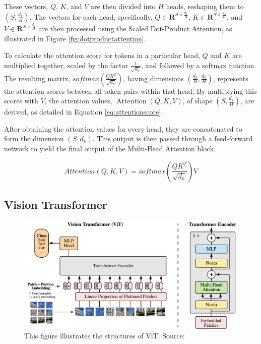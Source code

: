 These vectors, $Q$, $K$, and $V$ are then divided into $H$ heads, reshaping them to $(S, \frac{d_k}{H})$. The vectors for each head, specifically, $Q \in \mathbf{R}^{S \times \frac{d_k}{H}}$, $K \in \mathbf{R}^{S \times \frac{d_k}{H}}$, and $V \in \mathbf{R}^{S \times \frac{d_k}{H}}$ are then processed using the Scaled Dot-Product Attention, as illustrated in Figure \ref{fig:dotproductattention}. 

To calculate the attention score for tokens in a particular head, $Q$ and $K$ are multiplied together, scaled by the factor $\frac{1}{\sqrt{d_k}}$, and followed by a softmax function. The resulting matrix, $softmax\left(\frac{Q K^T}{\sqrt{d_k}}\right)$, having dimensions $(\frac{d_k}{H}, \frac{d_k}{H})$, represents the attention scores between all token pairs within that head. By multiplying this scores with $V$, the attention values, $\operatorname{Attention}(Q, K, V)$, of shape $(S, \frac{d_k}{H})$, are derived, as detailed in Equation \ref{eq:attentionscore}.
 
After obtaining the attention values for every head, they are concatenated to form the dimension $(S, d_k)$. This output is then passed through a feed-forward network to yield the final output of the Multi-Head Attention block.

\begin{equation}
    Attention(Q, K, V)=softmax\left(\frac{Q K^T}{\sqrt{d_k}}\right) V
    \label{eq:attentionscore}
\end{equation}

\subsection{Vision Transformer}

\begin{figure}[ht]
    \centering
    \includegraphics[width=1.0\textwidth]{assets/charts_rw/ViT}
    \caption[Illustration of ViT's Structures]{This figure illustrates the structures of ViT. Source: \parencite{dosovitskiy2020image}}
    \label{fig:structuresvit}
\end{figure}

